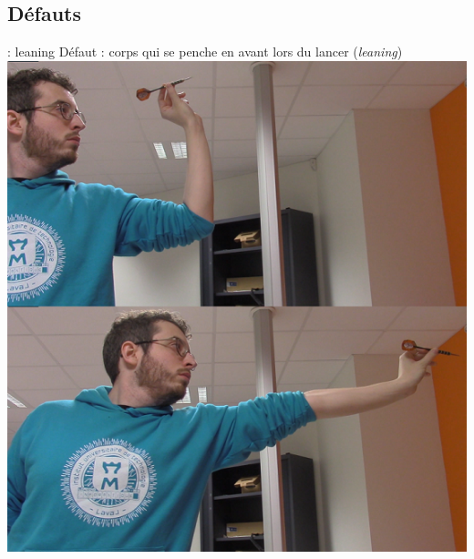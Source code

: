 \documentclass[svgnames]{beamer}
\begin{document}
	\subsection{Défauts}
	\begin{frame}{\subsecname : leaning}
		Défaut : corps qui se penche en avant lors du lancer (\textit{leaning})\\
		\centering
		\includegraphics[scale=0.4]{img/darts_leaning_final.png}
	\end{frame}
\end{document}
